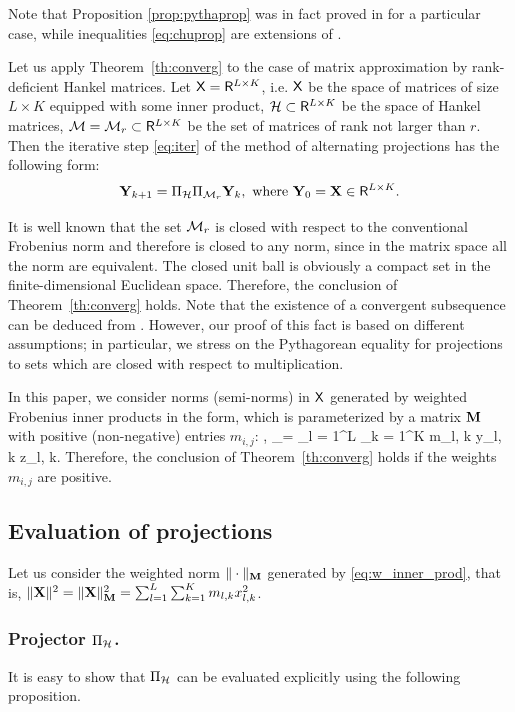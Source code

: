 \documentclass[sii]{ipart}
\begin{document}
Note that Proposition \ref{prop:pythaprop} was in fact proved in \cite{Gillard.Zhigljavsky2013} for a particular case, while inequalities \eqref{eq:chuprop} are extensions of \cite[inequalities (4.1)]{Chu.etal2003}.

\medskip
Let us apply Theorem~\ref{th:converg} to the case of matrix approximation by rank-deficient Hankel matrices. Let $\mathsf{X} = \mathsf{R}^{L\times K}$, i.e. $\mathsf{X}$ be the space of matrices of size $L \times K$ equipped with some inner product, $\mathcal{H} \subset \mathsf{R}^{L\times K}$ be the space of Hankel matrices, $\mathcal{M} = \mathcal{M}_r\subset \mathsf{R}^{L\times K}$ be the set of matrices of rank not larger than $r$. Then the iterative step \eqref{eq:iter} of the method of alternating projections has the following form:
\begin{equation*}
\bfY_{k+1}=\Pi_\calH \Pi_{\calM_r} \bfY_{k}, \mbox{\ where\ } \bfY_{0}=\bfX \in \spaceR^{L\times K}.
\end{equation*}

It is well known that the set $\mathcal{M}_r$ is closed with respect to the conventional Frobenius norm and therefore is closed
to any norm, since in the matrix space all the norm are equivalent.
The closed unit ball is obviously a compact set in the finite-dimensional Euclidean space.
Therefore, the conclusion of Theorem~\ref{th:converg} holds.
Note that the existence of a convergent subsequence can be deduced from \cite{Cadzow1988}.
However, our proof of this fact is based on different assumptions; in particular, we stress on the Pythagorean equality for projections to sets which are closed with respect to multiplication.

In this paper, we consider norms (semi-norms) in $\mathsf{X}$ generated by weighted Frobenius inner products in the form, which is parameterized by a matrix $\mathbf{M}$ with positive (non-negative) entries $m_{i,j}$:
\be
\label{eq:w_inner_prod}
\langle\bfY, \bfZ\rangle_\bfM = \sum_{l = 1}^L \sum_{k = 1}^K m_{l, k} y_{l, k} z_{l, k}.
\ee
Therefore, the conclusion of Theorem~\ref{th:converg} holds if the weights $m_{i,j}$ are positive.

\subsection{Evaluation of projections}
Let us consider the weighted norm $\|\cdot\|_{\mathbf{M}}$ generated by \eqref{eq:w_inner_prod}, that is, $\|\mathbf{X}\|^2 = \|\mathbf{X}\|^2_{\mathbf{M}} = \sum_{l = 1}^L \sum_{k = 1}^K m_{l, k} x^2_{l, k}$.

\subsubsection{Projector $\Pi_{\mathcal{H}}$.}
\label{sec:projH}
It is easy to show that $\Pi_{\mathcal{H}}$
can be evaluated explicitly using the following proposition.
\end{document}
